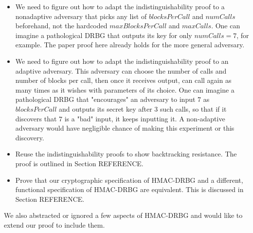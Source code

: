 \documentclass[12pt,lot, lof]{puthesis}
\begin{document}
{\begin{itemize}
\item We need to figure out how to adapt the indistinguishability proof to a nonadaptive adversary that picks any list of $blocksPerCall$ and $numCalls$ beforehand, not the hardcoded $maxBlocksPerCall$ and $maxCalls$. One can imagine a pathological DRBG that outputs its key for only $numCalls = 7$, for example. The paper proof here already holds for the more general adversary.
\item We need to figure out how to adapt the indistinguishability proof to an adaptive adversary. This adversary can choose the number of calls and number of blocks per call, then once it receives output, can call again as many times as it wishes with parameters of its choice. One can imagine a pathological DRBG that "encourages" an adversary to input $7$ as $blocksPerCall$ and outputs its secret key after 3 such calls, so that if it discovers that $7$ is a "bad" input, it keeps inputting it. A non-adaptive adversary would have negligible chance of making this experiment or this discovery.
\item Reuse the indistinguishability proofs to show backtracking resistance. The proof is outlined in Section REFERENCE.
\item Prove that our cryptographic specification of HMAC-DRBG and a different, functional specification of HMAC-DRBG are equivalent. This is discussed in Section REFERENCE.
\end{itemize}

We also abstracted or ignored a few aspects of HMAC-DRBG and would like to extend our proof to include them.

}
\end{document}
